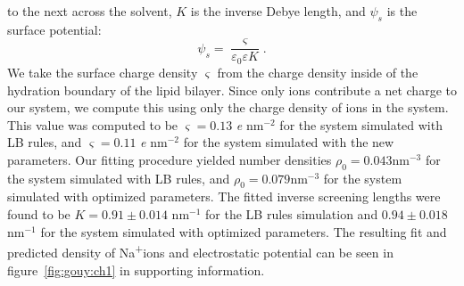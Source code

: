 \documentclass[12pt,openany,final]{book}
\newcommand{\na}{Na\textsuperscript{+}}
\begin{document}
to the next across the solvent, $K$ is the inverse Debye length, and $\psi_s$ is the surface potential:
\begin{equation}
    \psi_s = \frac{\varsigma}{\varepsilon_0\varepsilon K}\text{.}
\label{eq:gcspot}
\end{equation}
We take the surface charge density $\varsigma$ from the charge density inside
of the hydration boundary of the lipid bilayer. Since only ions
contribute a net charge to our system, we compute this using only the
charge density of ions in the system. 
This value was computed to be $\varsigma=0.13$ \emph{e} nm$^{-2}$ for the system simulated with LB rules, and 
$\varsigma=0.11$ \emph{e} nm$^{-2}$ for the system simulated with the new parameters.
Our fitting procedure yielded 
number densities $\rho _{0}=0.043\text{nm}^{-3}$ for the system simulated with LB rules, 
and $\rho _{0}=0.079\text{nm}^{-3}$ for the system simulated with optimized parameters.
The fitted inverse screening lengths were found to be $K=0.91 \pm 0.014$ nm$^{-1}$ for the LB rules simulation 
and $0.94 \pm 0.018$ nm$^{-1}$ for the system simulated with optimized parameters.
The resulting fit and predicted
density of \na ions and electrostatic potential can be seen in
figure~\ref{fig:gouy:ch1} in supporting information. 
\end{document}
